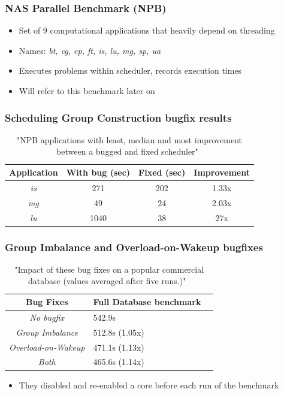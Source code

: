 \documentclass{beamer}
\newcommand{\linespace}{\vskip 0.25cm}
\begin{document}
\begin{frame}
\frametitle{NAS Parallel Benchmark (NPB)}

\begin{itemize}

\item Set of 9 computational applications that heavily depend on threading
\linespace
\item Names: \textit{bt, cg, ep, ft, is, lu, mg, sp, ua}
\linespace
\item Executes problems within scheduler, records execution times

\item Will refer to this benchmark later on

\end{itemize}
\end{frame}

\begin{frame}
\frametitle{Scheduling Group Construction bugfix results}

\begin{table}
	\centering
	\begin{tabular}{| c | c | c | c |}
		\hline			
	  	\textbf{Application} & \textbf{With bug (sec)} & \textbf{Fixed (sec)} & \textbf{Improvement} \\ \hline
		\emph{is} & 271 & 202 & 1.33x \\ \hline
		\emph{mg} & 49 & 24 & 2.03x \\ \hline
		\emph{lu} & 1040 & 38 & 27x \\ \hline
	\end{tabular}
	\caption{"NPB applications with least, median and most improvement between a bugged and fixed scheduler"~\cite{Lozi:2016}}
\end{table}

\end{frame}

\begin{frame}
\frametitle{Group Imbalance and Overload-on-Wakeup bugfixes}
\begin{table}
	\centering
	\begin{tabular}{| c | l | l |}
		\hline			
	  	\textbf{Bug Fixes} & \textbf{Full Database benchmark} \\ \hline
		\emph{No bugfix} & 542.9s \\ \hline
		\emph{Group Imbalance} & 512.8s (1.05x) \\ \hline
		\emph{Overload-on-Wakeup} & 471.1s (1.13x) \\ \hline
		\emph{Both} & 465.6s (1.14x) \\ \hline
	\end{tabular}
	\caption{"Impact of these bug fixes on a popular commercial database (values averaged after five runs.)"~\cite{Lozi:2016}}
\end{table}
\begin{itemize}
	\item They disabled and re-enabled a core before each run of the benchmark
\end{itemize}
\end{frame}
\end{document}
